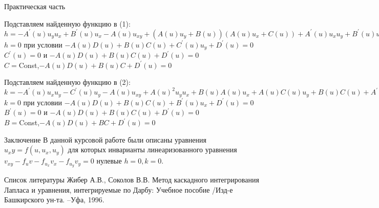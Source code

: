 \documentclass{beamer}
\begin{document}
\begin{frame}{Практическая часть}

Подставляем найденную функцию в (1):
\\ $h=-A^{'}  (u) u_y u_x+B^{'}  (u) u_x-A(u) u_{xy}+(A(u) u_y+B(u) )(A(u) u_x+C(u) )+A^{'}  (u) u_x u_y+B^{'}  (u) u_x+C^{'}  (u) u_y+D^{'}  (u)=-A(u)^{2} u_x u_y-A(u)B(u) u_x-A(u)C(u) u_y-A(u)D(u)+A(u)^{2} u_y u_x+B(u)A(u) u_x+A(u) C(u)u_y+B(u)C(u)+C^{'}  (u) u_y+D^{'}  (u)=-A(u)D(u)+B(u)C(u)+C^{'}  (u) u_y+D^{'}  (u)=0$
\\ $h=0$ при условии  $-A(u)D(u)+B(u)C(u)+C^{'}  (u) u_y+D^{'}  (u)=0$
\\ $C^{'}  (u)=0$ и  $-A(u)D(u)+B(u)C(u)+D^{'}  (u)=0$
\\ $C=$Const,$-A(u)D(u)+B(u)C+D^{'} (u)=0 $
\end{frame}


\begin{frame}
Подставляем найденную функцию в (2):
\\ $k=-A^{'}  (u) u_x u_y-C^{'}  (u) u_y-A(u) u_{xy}+A(u)^{2} u_y u_x+B(u)A(u) u_x+A(u) C(u)u_y+B(u)C(u)+A^{'}  (u) u_x u_y+B^{'}  (u) u_x+C^{'}  (u) u_y+D^{'}  (u)=-A(u)^{2} u_x u_y-A(u)B(u) u_x-A(u)C(u) u_y-A(u)D(u)+A(u)^{2} u_y u_x+B(u)A(u) u_x+A(u) C(u)u_y+B(u)C(u)+B^{'}  (u) u_x+D^{'}  (u)=-A(u)D(u)+B(u)C(u)+B^{'}  (u) u_x+D^{'}  (u)=0$
 \\$k=0$ при условии $-A(u)D(u)+B(u)C(u)+B^{'}  (u) u_x+D^{'}  (u)=0$
 \\$B^{'}  (u)=0$ и $-A(u)D(u)+B(u)C(u)+D^{'}  (u)=0$
\\ $B=$Const,$-A(u)D(u)+BC+D^{'} (u)=0$

\end{frame}

\begin{frame}{Заключение}
В данной курсовой работе были описаны уравнения $u_xy=f(u,u_x,u_y)$ для которых инварианты линеаризованного уравнения $v_{xy}-f_uv-f_{u_x}v_x-f_{u_y}v_y=0$ нулевые $h=0,k=0$.
\end{frame}



\begin{frame}{Список литературы}
Жибер А.В., Соколов В.В. Метод каскадного интегрирования Лапласа и уравнения, интегрируемые по Дарбу: Учебное пособие /Изд-е Башкирского ун-та. –Уфа, 1996.
\end{frame}
\end{document}

